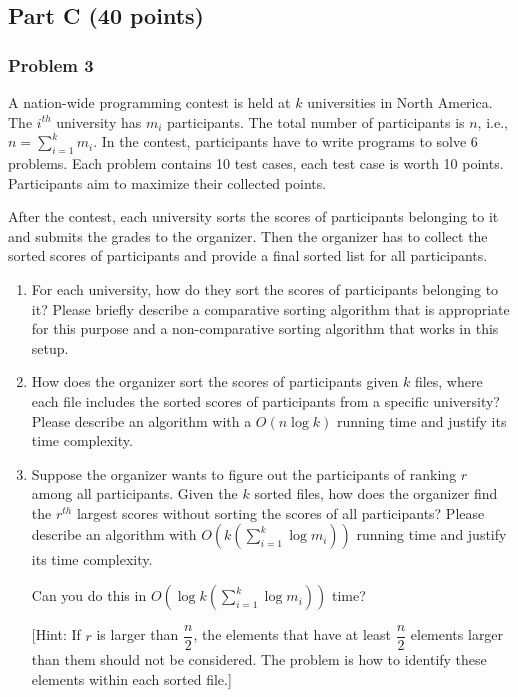 \documentclass[11pt]{article}
\begin{document}
\subsection*{Part C (40 points)}

\subsubsection*{Problem 3} 

A nation-wide programming contest is held
at $k$ universities in North America. The $i^{th}$ university has
$m_{i}$ participants. The total number of participants is $n$, i.e.,
$n = \sum_{i=1}^{k}m_{i}$. In the contest, participants have to write
programs to solve 6 problems. Each problem contains 10 test cases,
each test case is worth 10 points. Participants aim to maximize their
collected points.  

After the contest, each university sorts the scores of participants
belonging to it and submits the grades to the organizer.  Then the
organizer has to collect the sorted scores of participants and provide
a final sorted list for all participants.

\begin{enumerate}

\item For each university, how do they sort the scores of participants
  belonging to it? Please briefly describe a comparative sorting
  algorithm that is appropriate for this purpose and a non-comparative
  sorting algorithm that works in this setup.

\item How does the organizer sort the scores of participants given $k$
  files, where each file includes the sorted scores of participants
  from a specific university?  Please describe an algorithm with a
  $O(n\log k)$ running time and justify its time complexity.

\item Suppose the organizer wants to figure out the participants of
  ranking $r$ among all participants. Given the $k$ sorted files, how
  does the organizer find the $r^{th}$ largest scores without sorting
  the scores of all participants?  Please describe an algorithm with
  $O(k (\sum_{i=1}^{k}\log m_{i}) )$ running time and justify its time
  complexity. 

Can you do this in $O(\log k(\sum_{i=1}^{k}\log m_{i}))$ time?

[Hint: If $r$ is larger than $\dfrac{n}{2}$, the elements that have at
  least $\dfrac{n}{2}$ elements larger than them should not be
  considered. The problem is how to identify these elements within
  each sorted file.]\\

\end{enumerate}
\end{document}
